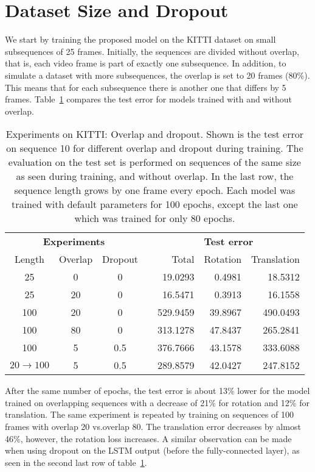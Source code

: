 	\section{Dataset Size and Dropout}
		We start by training the proposed model on the KITTI dataset on small subsequences of 25 frames. 
		Initially, the sequences are divided without overlap, that is, each video frame is part of exactly one subsequence.
		In addition, to simulate a dataset with more subsequences, the overlap is set to 20 frames (80\%). 
		This means that for each subsequence there is another one that differs by 5 frames.
		Table~\ref{tbl:kitti-overlap-and-dropout} compares the test error for models trained with and without overlap.
		\begin{table}[tb]
			\small
			\begin{center}
				\begin{tabular}{ccccrrr}
					\toprule
					\multicolumn{3}{c}{\textbf{Experiments}}	&	& \multicolumn{3}{c}{\textbf{Test error}} 		\\
					\cmidrule(lr){1-3} 					\cmidrule(lr){5-7}
					Length 			& Overlap 	& Dropout	&	& Total 	& Rotation	& Translation	\\ 
					\midrule
					25				& 0			& 0			& 	& 19.0293	& 0.4981	& 18.5312		\\ 
					25				& 20		& 0			&	& 16.5471	& 0.3913	& 16.1558		\\ 
					100				& 20		& 0			&	& 529.9459	& 39.8967	& 490.0493		\\ 
					100				& 80		& 0			& 	& 313.1278	& 47.8437	& 265.2841		\\ 
					100 			& 5			& 0.5		&	& 376.7666	& 43.1578	& 333.6088		\\ 
					$20\rightarrow100$ 	& 5		& 0.5		&	& 289.8579 	& 42.0427 	& 247.8152 		\\
					\bottomrule
				\end{tabular}
			\end{center}
			\caption[Experiments on KITTI: Overlap and dropout]
					{Experiments on KITTI: Overlap and dropout. 
					 Shown is the test error on sequence 10 for different overlap and dropout during training.
					 The evaluation on the test set is performed on sequences of the same size as seen during training, and without overlap.
					 In the last row, the sequence length grows by one frame every epoch.
					 Each model was trained with default parameters for 100 epochs, except the last one which was trained for only 80 epochs.
					 \label{tbl:kitti-overlap-and-dropout}}
		\end{table}
		After the same number of epochs, the test error is about 13\% lower for the model trained on overlapping sequences with a decrease of 21\% for rotation and 12\% for translation.
		The same experiment is repeated by training on sequences of 100 frames with overlap 20 vs.\@ overlap 80. 
		The translation error decreases by almost 46\%, however, the rotation loss increases.
		A similar observation can be made when using dropout on the LSTM output (before the fully-connected layer), as seen in the second last row of table~\ref{tbl:kitti-overlap-and-dropout}.
		
